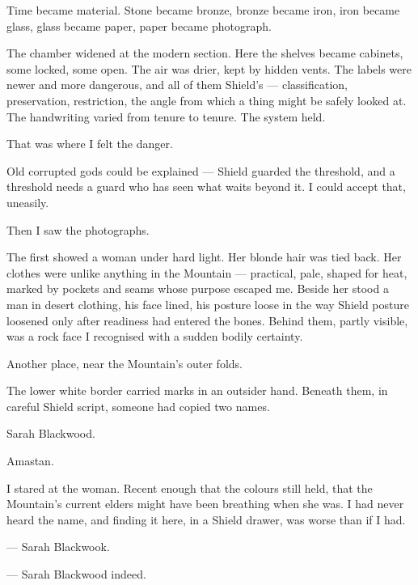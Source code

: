 Time became material. Stone became bronze, bronze became iron, iron became glass, glass became paper, paper became photograph.\par

The chamber widened at the modern section. Here the shelves became cabinets, some locked, some open. The air was drier, kept by hidden vents. The labels were newer and more dangerous, and all of them Shield's --- classification, preservation, restriction, the angle from which a thing might be safely looked at. The handwriting varied from tenure to tenure. The system held.\par

That was where I felt the danger.\par

Old corrupted gods could be explained --- Shield guarded the threshold, and a threshold needs a guard who has seen what waits beyond it. I could accept that, uneasily.\par

Then I saw the photographs.\par

The first showed a woman under hard light. Her blonde hair was tied back. Her clothes were unlike anything in the Mountain --- practical, pale, shaped for heat, marked by pockets and seams whose purpose escaped me. Beside her stood a man in desert clothing, his face lined, his posture loose in the way Shield posture loosened only after readiness had entered the bones. Behind them, partly visible, was a rock face I recognised with a sudden bodily certainty.\par

Another place, near the Mountain's outer folds.\par

The lower white border carried marks in an outsider hand. Beneath them, in careful Shield script, someone had copied two names.\par

Sarah Blackwood.\par

Amastan.\par

I stared at the woman. Recent enough that the colours still held, that the Mountain's current elders might have been breathing when she was. I had never heard the name, and finding it here, in a Shield drawer, was worse than if I had.\par
\begin{room}
--- Sarah Blackwook.

--- Sarah Blackwood indeed.
\end{room}

